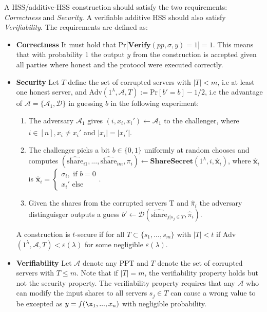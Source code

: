 A HSS/additive-HSS construction should satisfy the two requirements: \textit{Correctness} and \textit{Security}. A verifiable additive HSS should also satisfy \textit{Verifiability}. The requirements are defined as:
\begin{itemize}
    \item \textbf{Correctness} It must hold that Pr$\Big[\textbf{Verify}(pp,\sigma,y)=1\Big]=1$. This means that with probability $1$ the output $y$ from the construction is accepted given all parties where honest and the protocol were executed correctly.
    \item \textbf{Security} Let $T$ define the set of corrupted servers with $|T|<m$, i.e at least one honest server, and Adv$(1^\lambda,\mathcal{A},T):= \text{Pr}[b' = b]-1/2$, i.e the advantage of $\mathcal{A}=\{\mathcal{A}_1,\mathcal{D}\}$ in guessing $b$ in the following experiment:
    \begin{enumerate}
        \item The adversary $\mathcal{A}_1$ gives $(i,x_i,x_i')\xleftarrow[]{}\mathcal{A}_1$ to the challenger, where $i\in[n], x_i\neq x_i'$ and $|x_i|=|x_i'|$.
        \item The challenger picks a bit $b\in\{0,1\}$ uniformly at random chooses and computes $(\hat{\text{share}}_{i1},...,\hat{\text{share}}_{im},\pi_i)\xleftarrow[]{}\textbf{ShareSecret}(1^\lambda,i,\hat{\mathbf{x}}_i)$, where $\hat{\textbf{x}}_i$ is $\hat{\textbf{x}}_i = \begin{cases}\sigma_i, \text{ if } b=0 \\ x_i' \text{ else} \end{cases}$. 
        \item Given the shares from the corrupted servers T and $\hat{\pi}_i$ the adversary distinguisger outputs a guess $b'\xleftarrow[]{}\mathcal{D}(\hat{\text{share}}_{j|s_j\in T},\hat{\pi}_i)$.
    \end{enumerate}
    A construction is $t$-secure if for all $T\subset \{s_1,...,s_m\}$ with $|T|<t$ if Adv$(1^\lambda,\mathcal{A},T)<\varepsilon(\lambda)$ for some negligible $\varepsilon(\lambda)$.
    \item \textbf{Verifiability} Let $\mathcal{A}$ denote any PPT and $T$ denote the set of corrupted servers with $T\leq m$. Note that if $|T|=m$, the verifiability property holds but not the security property. The verifiability property requires that any $\mathcal{A}$ who can modify the input shares to all servers $s_j\in T$ can cause a wrong value to be excepted as $y=f(\x_1,...,x_n)$ with negligible probability.   
\end{itemize}



